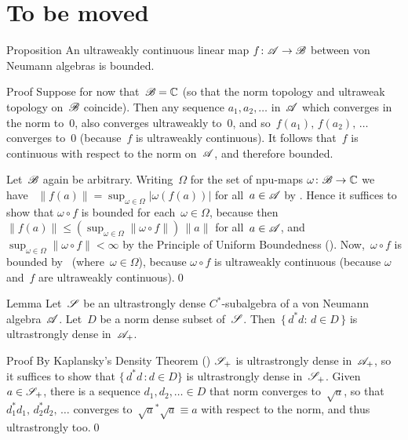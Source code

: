\documentclass[a]{subfiles}
\begin{document}
\section{To be moved}
\begin{parsec}%
\begin{point}{Proposition}%
An ultraweakly continuous linear map $f\colon \mathscr{A}\to\mathscr{B}$
between von Neumann algebras is bounded.
\begin{point}{Proof}%
Suppose for now that~$\mathscr{B}=\mathbb{C}$
(so that the norm topology and ultraweak topology on~$\mathscr{B}$ coincide).
Then any sequence $a_1,a_2,\dotsc$
in~$\mathscr{A}$ which converges in the norm to~$0$,
also converges ultraweakly to~$0$,
and so~$f(a_1),\,f(a_2),\,\dotsc$ converges
to~$0$ (because~$f$ is ultraweakly continuous).
It follows that~$f$ is continuous with respect to the norm
on~$\mathscr{A}$, and therefore bounded.
\begin{point}%
Let~$\mathscr{B}$ again be arbitrary.
Writing~$\Omega$ for the set of npu-maps $\omega\colon \mathscr{B}\to\mathbb{C}$
we have~
$\|f(a)\|=\sup_{\omega\in\Omega} \left|\omega(f(a))\right|$
for all~$a\in\mathscr{A}$
by \TODO{}.
Hence it suffices to show that $\omega\circ f$
is bounded for each~$\omega\in\Omega$,
because then $\|f(a)\|\leq (\sup_{\omega\in\Omega}\|\omega\circ f\|)\,\|a\|$
for all~$a\in \mathscr{A}$,
and~$\sup_{\omega\in \Omega} \|\omega\circ f\|<\infty$
by the Principle of Uniform Boundedness ().
Now,~$\omega\circ f$ is bounded by~ 
(where~$\omega\in\Omega$),
because $\omega\circ f$ is ultraweakly continuous
(because $\omega$ and~$f$ are ultraweakly continuous).\qed
\end{point}
\end{point}
\end{point}
\begin{point}{Lemma}%
Let~$\mathscr{S}$ be an ultrastrongly dense $C^*$-subalgebra
of a von Neumann algebra~$\mathscr{A}$.
Let~$D$ be a norm dense subset of~$\mathscr{S}$.
Then~$\{\,d^*d\colon\,d\in D\,\}$
is ultrastrongly dense in~$\mathscr{A}_{+}$.
\begin{point}{Proof}%
By Kaplansky's Density Theorem ()
$\mathscr{S}_{+}$ 
is ultrastrongly dense in~$\mathscr{A}_{+}$,
so it suffices to show that $\{\, d^*d\,\colon d\in D\}$
is ultrastrongly dense in~$\mathscr{S}_{+}$.
Given~$a\in \mathscr{S}_{+}$,
there is a sequence $d_1,d_2,\dotsc \in D$
that norm converges to~$\sqrt{a}$,
so that~$d_1^*d_1,\,d_2^*d_2,\,\dotsc$
converges to~$\sqrt{a}^*\sqrt{a}\equiv a$
with respect to the norm, and thus ultrastrongly too.\qed
\end{point}
\end{point}
\end{parsec}%
\end{document}
